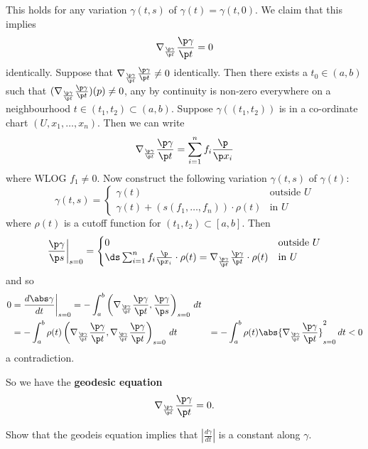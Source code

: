 This holds for any variation $\gamma(t,s)$ of $\gamma(t)=\gamma(t,0)$.
We claim that this implies
\[ \nabla_{\frac{\p\gamma}{\p t}} \frac{\p\gamma}{\p t} = 0 \]
identically.
Suppose that $\nabla_{\frac{\p\gamma}{\p t}} \frac{\p\gamma}{\p t} \neq 0$ identically.
Then there exists a $t_0 \in (a,b)$ such that $(\nabla_{\frac{\p\gamma}{\p t}} \frac{\p\gamma}{\p t})(p)\neq0$, any by continuity is non-zero everywhere on a neighbourhood $t\in(t_1,t_2)\subset(a,b)$.
Suppose $\gamma\left( (t_1,t_2) \right)$ is in a co-ordinate chart $(U,x_1,\ldots,x_n)$.
Then we can write
\[ \nabla_{\frac{\p\gamma}{\p t}} \frac{\p\gamma}{\p t} = \sum_{i=1}^n f_i \frac{\p}{\p x_i} \]
where WLOG $f_1\neq 0$.
Now construct the following variation $\gamma(t,s)$ of $\gamma(t)$:
\begin{equation*}
  \gamma(t,s)=
  \begin{cases}
    \gamma(t) &\text{outside $U$} \\
    \gamma(t) + \left( s(f_1,\ldots,f_n) \right)\cdot\rho(t) &\text{in $U$}
  \end{cases}
\end{equation*}
where $\rho(t)$ is a cutoff function for $(t_1,t_2)\subset[a,b]$.
Then
\begin{align*}
  \frac{\p\gamma}{\p s}\bigg\vert_{s=0}=
  \begin{cases}
    0 &\text{outside $U$} \\
    \ds \sum_{i=1}^n f_i \frac{\p}{\p x_i} \cdot \rho(t) = \nabla_{\frac{\p\gamma}{\p t}} \frac{\p\gamma}{\p t} \cdot \rho(t) &\text{in $U$}
  \end{cases}
\end{align*}
and so
\begin{align*}
  0 &= \frac{d\abs\gamma}{dt}\bigg\vert_{s=0} = - \int_a^b \left( \nabla_{\frac{\p\gamma}{\p t}} \frac{\p\gamma}{\p t}, \frac{\p\gamma}{\p s} \right)_{s=0} \, dt \\
  &= - \int_a^b \rho(t) \left( \nabla_{\frac{\p\gamma}{\p t}} \frac{\p\gamma}{\p t}, \nabla_{\frac{\p\gamma}{\p t}} \frac{\p\gamma}{\p t} \right)_{s=0} \, dt
  &= - \int_a^b \rho(t) \abs{ \nabla_{\frac{\p\gamma}{\p t}} \frac{\p\gamma}{\p t} }^2_{s=0} \, dt < 0
\end{align*}
a contradiction.

So we have the \textbf{geodesic equation}
\[ \nabla_{\frac{\p\gamma}{\p t}} \frac{\p\gamma}{\p t} = 0. \]

\begin{exer}
  Show that the geodeis equation implies that $|\tfrac{d\gamma}{dt}|$ is a constant along $\gamma$.
\end{exer}

